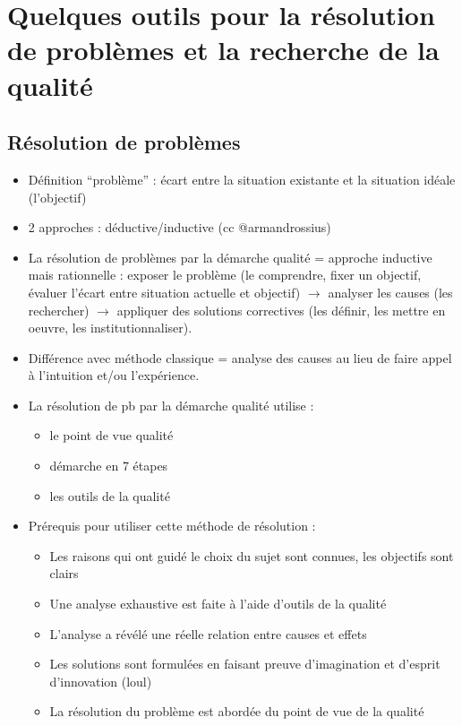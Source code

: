 	\section{Quelques outils pour la résolution de problèmes et la recherche de la qualité}
		\subsection{Résolution de problèmes}
			\begin{itemize}
			\item Définition “problème” : écart entre la situation existante et la situation idéale (l’objectif)
			\item 2 approches : déductive/inductive (cc @armandrossius)
			\item La résolution de problèmes par la démarche qualité = approche inductive mais rationnelle : exposer le problème (le comprendre, fixer un objectif, évaluer l'écart entre situation actuelle et objectif) $\rightarrow$ analyser les causes (les rechercher) $\rightarrow$ appliquer des solutions correctives (les définir, les mettre en oeuvre, les institutionnaliser). 
			\item Différence avec méthode classique = analyse des causes au lieu de faire appel à l'intuition et/ou l'expérience. 
			\item La résolution de pb par la démarche qualité utilise : 
				\begin{itemize}
				\item le point de vue qualité
				\item démarche en 7 étapes 
				\item les outils de la qualité
				\end{itemize}
			\item Prérequis pour utiliser cette méthode de résolution : 
				\begin{itemize}
				\item Les raisons qui ont guidé le choix du sujet sont connues, les objectifs sont clairs
				\item Une analyse exhaustive est faite à l'aide d'outils de la qualité
				\item L'analyse a révélé une réelle relation entre causes et effets 
				\item Les solutions sont formulées en faisant preuve d'imagination et d'esprit d'innovation (loul) 
				\item La résolution du problème est abordée du point de vue de la qualité
				\end{itemize}

\end{itemize}
